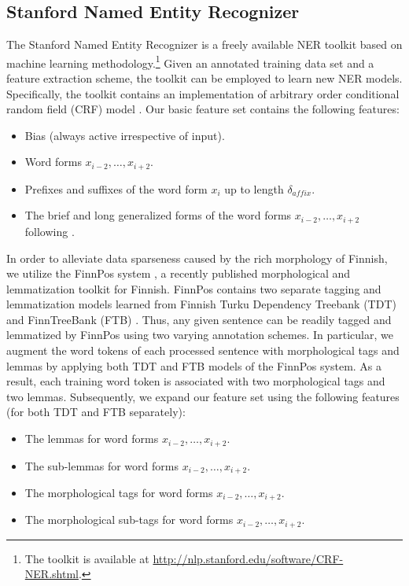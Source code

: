\documentclass[11pt]{article}
\begin{document}
\subsection{Stanford Named Entity Recognizer}

The Stanford Named Entity Recognizer is a freely available NER toolkit based on machine learning methodology.\footnote{The toolkit is available at \url{http://nlp.stanford.edu/software/CRF-NER.shtml}.} Given an annotated training data set and a feature extraction scheme, the toolkit can be employed to learn new NER models. Specifically, the toolkit contains an implementation of arbitrary order conditional random field (CRF) model \citep{lafferty2001,finkel2005}. Our basic feature set contains the following features:

\begin{itemize}
\item[1.] Bias (always active irrespective of input).
\item[2.] Word forms $x_{i-2}, \dots, x_{i+2}$.
\item[3.] Prefixes and suffixes of the word form $x_i$ up to length $\delta_{affix}$.
\item[4.] The brief and long generalized forms of the word forms $x_{i-2}, \dots, x_{i+2}$ following \citet{collins2002}.
\end{itemize}

In order to alleviate data sparseness caused by the rich morphology of Finnish, we utilize the FinnPos system \citep{silfverberg2016}, a recently published morphological and lemmatization toolkit for Finnish. FinnPos contains two separate tagging and lemmatization models learned from Finnish Turku Dependency Treebank (TDT) \citep{haverinen2014} and FinnTreeBank (FTB) \citep{voutilainen2011}. Thus, any given sentence can be readily tagged and lemmatized by FinnPos using two varying annotation schemes. In particular, we augment the word tokens of each processed sentence with morphological tags and lemmas by applying both TDT and FTB models of the FinnPos system. As a result, each training word token is associated with two morphological tags and two lemmas. Subsequently, we expand our feature set using the following features (for both TDT and FTB separately):

\begin{itemize}
\item[5.] The lemmas for word forms $x_{i-2}, \dots, x_{i+2}$. 
\item[6.] The sub-lemmas for word forms $x_{i-2}, \dots, x_{i+2}$. 
\item[7.] The morphological tags for word forms $x_{i-2}, \dots, x_{i+2}$.
\item[8.] The morphological sub-tags for word forms $x_{i-2}, \dots, x_{i+2}$.
\end{itemize}
\end{document}
